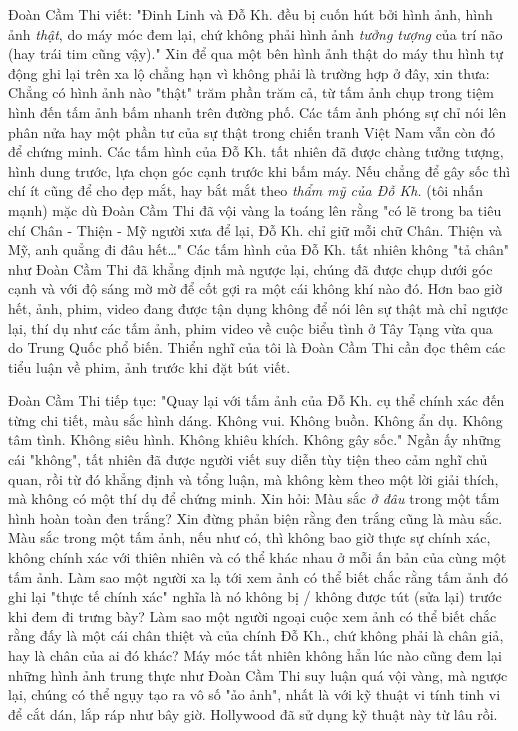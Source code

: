\documentclass[../main.tex]{subfiles}
\begin{document}
\begin{multicols}{2}
Đoàn Cầm Thi viết: "Đinh Linh và Đỗ Kh. đều bị cuốn hút bởi hình ảnh, hình ảnh \textit{thật}, do máy móc đem lại, chứ không phải hình ảnh \textit{tưởng tượng} của trí não (hay trái tim cũng vậy)." Xin để qua một bên hình ảnh thật do máy thu hình tự động ghi lại trên xa lộ chẳng hạn vì không phải là trường hợp ở đây, xin thưa: Chẳng có hình ảnh nào "thật" trăm phần trăm cả, từ tấm ảnh chụp trong tiệm hình đến tấm ảnh bấm nhanh trên đường phố. Các tấm ảnh phóng sự chỉ nói lên phân nửa hay một phần tư của sự thật trong chiến tranh Việt Nam vẫn còn đó để chứng minh. Các tấm hình của Đỗ Kh. tất nhiên đã được chàng tưởng tượng, hình dung trước, lựa chọn góc cạnh trước khi bấm máy. Nếu chẳng để gây sốc thì chí ít cũng để cho đẹp mắt, hay bắt mắt theo \textit{thẩm mỹ của Đỗ Kh.} (tôi nhấn mạnh) mặc dù Đoàn Cầm Thi đã vội vàng la toáng lên rằng "có lẽ trong ba tiêu chí Chân - Thiện - Mỹ người xưa để lại, Đỗ Kh. chỉ giữ mỗi chữ Chân. Thiện và Mỹ, anh quẳng đi đâu hết…" Các tấm hình của Đỗ Kh. tất nhiên không "tả chân" như Đoàn Cầm Thi đã khẳng định mà ngược lại, chúng đã được chụp dưới góc cạnh và với độ sáng mờ mờ để cốt gợi ra một cái không khí nào đó. Hơn bao giờ hết, ảnh, phim, video đang được tận dụng không để nói lên sự thật mà chỉ ngược lại, thí dụ như các tấm ảnh, phim video về cuộc biểu tình ở Tây Tạng vừa qua do Trung Quốc phổ biến. Thiển nghĩ của tôi là Đoàn Cầm Thi cần đọc thêm các tiểu luận về phim, ảnh trước khi đặt bút viết. 
 
Đoàn Cầm Thi tiếp tục: "Quay lại với tấm ảnh của Đỗ Kh. cụ thể chính xác đến từng chi tiết, màu sắc hình dáng. Không vui. Không buồn. Không ẩn dụ. Không tâm tình. Không siêu hình. Không khiêu khích. Không gây sốc." Ngần ấy những cái "không", tất nhiên đã được người viết suy diễn tùy tiện theo cảm nghĩ chủ quan, rồi từ đó khẳng định và tổng luận, mà không kèm theo một lời giải thích, mà không có một thí dụ để chứng minh. Xin hỏi: Màu sắc \textit{ở đâu} trong một tấm hình hoàn toàn đen trắng? Xin đừng phản biện rằng đen trắng cũng là màu sắc. Màu sắc trong một tấm ảnh, nếu như có, thì không bao giờ thực sự chính xác, không chính xác với thiên nhiên và có thể khác nhau ở mỗi ấn bản của cùng một tấm ảnh. Làm sao một người xa lạ tới xem ảnh có thể biết chắc rằng tấm ảnh đó ghi lại "thực tế chính xác" nghĩa là nó không bị / không được tút (sửa lại) trước khi đem đi trưng bày? Làm sao một người ngoại cuộc xem ảnh có thể biết chắc rằng đấy là một cái chân thiệt và của chính Đỗ Kh., chứ không phải là chân giả, hay là chân của ai đó khác? Máy móc tất nhiên không hẳn lúc nào cũng đem lại những hình ảnh trung thực như Đoàn Cầm Thi suy luận quá vội vàng, mà ngược lại, chúng có thể ngụy tạo ra vô số "ảo ảnh", nhất là với kỹ thuật vi tính tinh vi để cắt dán, lắp ráp như bây giờ. Hollywood đã sử dụng kỹ thuật này từ lâu rồi. 
 

\end{multicols}
\end{document}
